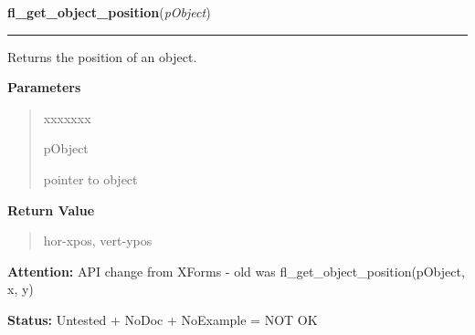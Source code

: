 \hspace{.8\funcindent}\begin{boxedminipage}{\funcwidth}

    \raggedright \textbf{fl\_get\_object\_position}(\textit{pObject})

    \vspace{-1.5ex}

    \rule{\textwidth}{0.5\fboxrule}
\setlength{\parskip}{2ex}
    Returns the position of an object.

\setlength{\parskip}{1ex}
      \textbf{Parameters}
      \vspace{-1ex}

      \begin{quote}
        \begin{Ventry}{xxxxxxx}

          \item[pObject]

          pointer to object

        \end{Ventry}

      \end{quote}

      \textbf{Return Value}
    \vspace{-1ex}

      \begin{quote}
      hor-xpos, vert-ypos

      \end{quote}

\textbf{Attention:} API change from XForms - old was fl\_get\_object\_position(pObject, x, y)



\textbf{Status:} Untested + NoDoc + NoExample = NOT OK



    \end{boxedminipage}

    \label{xformslib:library:fl_get_object_bbox}

    \vspace{0.5ex}


